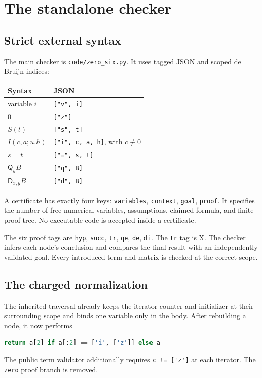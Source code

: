 \documentclass[11pt]{article}
\newcommand{\Q}{\mathsf Q}\newcommand{\D}{\mathsf D}
\newcommand{\code}[1]{\nolinkurl{#1}}
\begin{document}
\section{The standalone checker}\label{sec:checker}
\subsection{Strict external syntax}
The main checker is \code{code/zero_six.py}. It uses tagged JSON and
scoped de Bruijn indices:
\begin{center}
\begin{tabular}{ll}
\toprule
Syntax&JSON\\\midrule
variable \(i\)&\code{["v", i]}\\
\(0\)&\code{["z"]}\\
\(S(t)\)&\code{["s", t]}\\
\(I(c,a;u.h)\)&\code{["i", c, a, h]}, with \(c\not\equiv0\)\\
\(s=t\)&\code{["=", s, t]}\\
\(\Q_yB\)&\code{["q", B]}\\
\(\D_{x,y}B\)&\code{["d", B]}\\\bottomrule
\end{tabular}
\end{center}
A certificate has exactly four keys:
\code{variables}, \code{context}, \code{goal}, \code{proof}.
It specifies the number of free numerical variables, assumptions,
claimed formula, and finite proof tree. No executable code is accepted
inside a certificate.

The six proof tags are \code{hyp}, \code{succ}, \code{tr},
\code{qe}, \code{de}, \code{di}. The \code{tr} tag is X.
The checker infers each node's conclusion and compares the final
result with an independently validated goal. Every introduced term
and matrix is checked at the correct scope.

\subsection{The charged normalization}
The inherited traversal already keeps the iterator counter and
initializer at their surrounding scope and binds one variable only
in the body. After rebuilding a node, it now performs
\begin{lstlisting}[language=Python]
return a[2] if a[:2] == ['i', ['z']] else a
\end{lstlisting}
The public term validator additionally requires
\code{c != ['z']} at each iterator. The \code{zero} proof branch
is removed.
\end{document}
